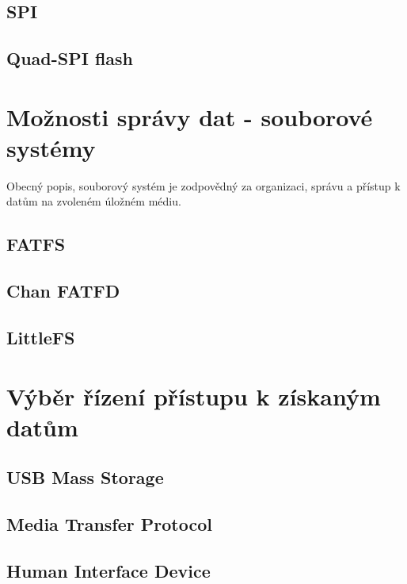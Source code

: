 \subsection{SPI}
\subsection{Quad-SPI flash}


\section{Možnosti správy dat - souborové systémy} 
Obecný popis, souborový systém je zodpovědný za organizaci, správu a přístup k datům na zvoleném úložném médiu.

\subsection{FATFS}

\subsection{Chan FATFD}

\subsection{LittleFS}



\section{Výběr řízení přístupu k získaným datům}

\subsection{USB Mass Storage}

\subsection{Media Transfer Protocol}

\subsection{Human Interface Device}

